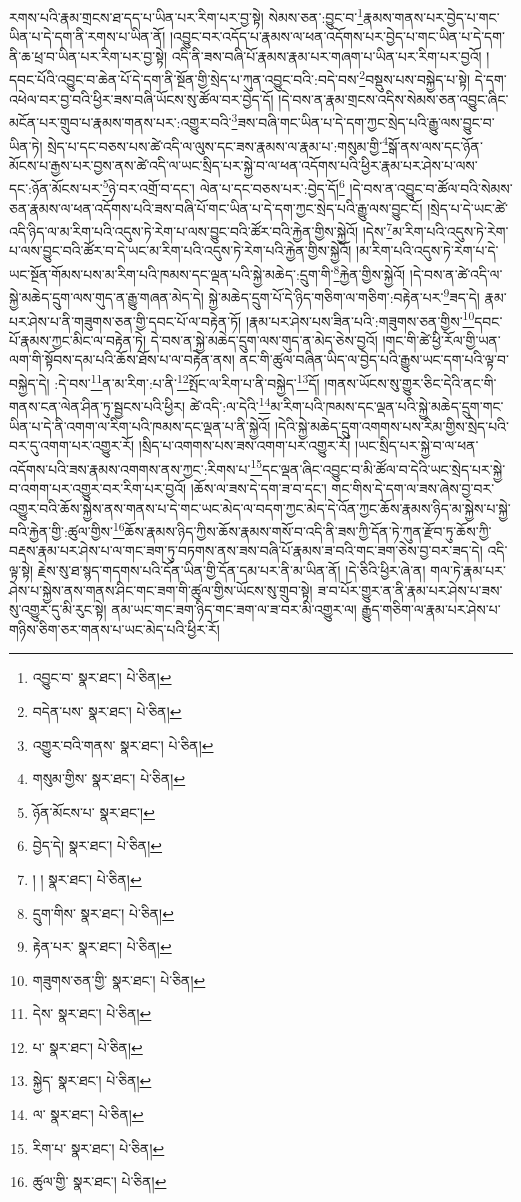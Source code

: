 རགས་པའི་རྣམ་གྲངས་ཐ་དད་པ་ཡིན་པར་རིག་པར་བྱ་སྟེ། སེམས་ཅན་:བྱུང་བ་\footnote{འབྱུང་བ་  སྣར་ཐང་།  པེ་ཅིན། }རྣམས་གནས་པར་བྱེད་པ་གང་ཡིན་པ་དེ་དག་ནི་རགས་པ་ཡིན་ནོ། །འབྱུང་བར་འདོད་པ་རྣམས་ལ་ཕན་འདོགས་པར་བྱེད་པ་གང་ཡིན་པ་དེ་དག་ནི་ཆ་ཕྲ་བ་ཡིན་པར་རིག་པར་བྱ་སྟེ། འདི་ནི་ཟས་བཞི་པོ་རྣམས་རྣམ་པར་གཞག་པ་ཡིན་པར་རིག་པར་བྱའོ། །དབང་པོའི་འབྱུང་བ་ཆེན་པོ་དེ་དག་ནི་སྔོན་གྱི་སྲེད་པ་ཀུན་འབྱུང་བའི་:བདེ་བས་\footnote{བདེན་པས་  སྣར་ཐང་།  པེ་ཅིན། }བསྡུས་པས་བསྐྱེད་པ་སྟེ། དེ་དག་འཕེལ་བར་བྱ་བའི་ཕྱིར་ཟས་བཞི་ཡོངས་སུ་ཚོལ་བར་བྱེད་དོ། །དེ་བས་ན་རྣམ་གྲངས་འདིས་སེམས་ཅན་འབྱུང་ཞིང་མངོན་པར་གྲུབ་པ་རྣམས་གནས་པར་:འགྱུར་བའི་\footnote{འགྱུར་བའི་གནས་  སྣར་ཐང་།  པེ་ཅིན། }ཟས་བཞི་གང་ཡིན་པ་དེ་དག་ཀྱང་སྲེད་པའི་རྒྱུ་ལས་བྱུང་བ་ཡིན་ཏེ། སྲེད་པ་དང་བཅས་པས་ཚེ་འདི་ལ་ལུས་དང་ཟས་རྣམས་ལ་རྣམ་པ་:གསུམ་གྱི་\footnote{གསུམ་གྱིས་  སྣར་ཐང་།  པེ་ཅིན། }སྒོ་ནས་ལས་དང་ཉོན་མོངས་པ་རྒྱས་པར་བྱས་ནས་ཚེ་འདི་ལ་ཡང་སྲིད་པར་སྐྱེ་བ་ལ་ཕན་འདོགས་པའི་ཕྱིར་རྣམ་པར་ཤེས་པ་ལས་དང་:ཉོན་མོངས་པར་\footnote{ཉོན་མོངས་པ་  སྣར་ཐང་། }ཉེ་བར་འགྲོ་བ་དང་། ལེན་པ་དང་བཅས་པར་:བྱེད་དོ།\footnote{བྱེད་དེ།  སྣར་ཐང་།  པེ་ཅིན། } །དེ་བས་ན་འབྱུང་བ་ཚོལ་བའི་སེམས་ཅན་རྣམས་ལ་ཕན་འདོགས་པའི་ཟས་བཞི་པོ་གང་ཡིན་པ་དེ་དག་ཀྱང་སྲེད་པའི་རྒྱུ་ལས་བྱུང་ངོ། །སྲེད་པ་དེ་ཡང་ཚེ་འདི་ཉིད་ལ་མ་རིག་པའི་འདུས་ཏེ་རེག་པ་ལས་བྱུང་བའི་ཚོར་བའི་རྐྱེན་གྱིས་སྐྱེའོ། །དེས་\footnote{། །  སྣར་ཐང་།  པེ་ཅིན། }མ་རིག་པའི་འདུས་ཏེ་རེག་པ་ལས་བྱུང་བའི་ཚོར་བ་དེ་ཡང་མ་རིག་པའི་འདུས་ཏེ་རེག་པའི་རྐྱེན་གྱིས་སྐྱེའོ། །མ་རིག་པའི་འདུས་ཏེ་རེག་པ་དེ་ཡང་སྔོན་གོམས་པས་མ་རིག་པའི་ཁམས་དང་ལྡན་པའི་སྐྱེ་མཆེད་:དྲུག་གི་\footnote{དྲུག་གིས་  སྣར་ཐང་།  པེ་ཅིན། }རྐྱེན་གྱིས་སྐྱེའོ། །དེ་བས་ན་ཚེ་འདི་ལ་སྐྱེ་མཆེད་དྲུག་ལས་གུད་ན་རྒྱུ་གཞན་མེད་དེ། སྐྱེ་མཆེད་དྲུག་པོ་དེ་ཉིད་གཅིག་ལ་གཅིག་:བརྟེན་པར་\footnote{རྟེན་པར་  སྣར་ཐང་།  པེ་ཅིན། }ཟད་དེ། རྣམ་པར་ཤེས་པ་ནི་གཟུགས་ཅན་གྱི་དབང་པོ་ལ་བརྟེན་ཏོ། །རྣམ་པར་ཤེས་པས་ཟིན་པའི་:གཟུགས་ཅན་གྱིས་\footnote{གཟུགས་ཅན་གྱི་  སྣར་ཐང་།  པེ་ཅིན། }དབང་པོ་རྣམས་ཀྱང་མིང་ལ་བརྟེན་ཏེ། དེ་བས་ན་སྐྱེ་མཆེད་དྲུག་ལས་གུད་ན་མེད་ཅེས་བྱའོ། །གང་གི་ཚེ་ཕྱི་རོལ་གྱི་ཡན་ལག་གི་སྟོབས་དམ་པའི་ཆོས་ཐོས་པ་ལ་བརྟེན་ནས། ནང་གི་ཚུལ་བཞིན་ཡིད་ལ་བྱེད་པའི་རྒྱུས་ཡང་དག་པའི་ལྟ་བ་བསྐྱེད་དེ། :དེ་བས་\footnote{དེས་  སྣར་ཐང་།  པེ་ཅིན། }ན་མ་རིག་:པ་ནི་\footnote{པ་  སྣར་ཐང་།  པེ་ཅིན། }སྤོང་ལ་རིག་པ་ནི་བསྐྱེད་\footnote{སྐྱེད་  སྣར་ཐང་།  པེ་ཅིན། }དོ། །གནས་ཡོངས་སུ་གྱུར་ཅིང་དེའི་ནང་གི་གནས་ངན་ལེན་ཤིན་ཏུ་སྦྱངས་པའི་ཕྱིར། ཚེ་འདི་:ལ་དེའི་\footnote{ལ་  སྣར་ཐང་།  པེ་ཅིན། }མ་རིག་པའི་ཁམས་དང་ལྡན་པའི་སྐྱེ་མཆེད་དྲུག་གང་ཡིན་པ་དེ་ནི་འགག་ལ་རིག་པའི་ཁམས་དང་ལྡན་པ་ནི་སྐྱེའོ། །དེའི་སྐྱེ་མཆེད་དྲུག་འགགས་པས་རིམ་གྱིས་སྲེད་པའི་བར་དུ་འགག་པར་འགྱུར་རོ། །སྲིད་པ་འགགས་པས་ཟས་འགག་པར་འགྱུར་རོ། །ཡང་སྲིད་པར་སྐྱེ་བ་ལ་ཕན་འདོགས་པའི་ཟས་རྣམས་འགགས་ནས་ཀྱང་:རིགས་པ་\footnote{རིག་པ་  སྣར་ཐང་།  པེ་ཅིན། }དང་ལྡན་ཞིང་འབྱུང་བ་མི་ཚོལ་བ་དེའི་ཡང་སྲེད་པར་སྐྱེ་བ་འགག་པར་འགྱུར་བར་རིག་པར་བྱའོ། །ཆོས་ལ་ཟས་དེ་དག་ཟ་བ་དང་། གང་གིས་དེ་དག་ལ་ཟས་ཞེས་བྱ་བར་འགྱུར་བའི་ཆོས་སྐྱེས་ནས་གནས་པ་དེ་གང་ཡང་མེད་ལ་བདག་ཀྱང་མེད་དེ་འོན་ཀྱང་ཆོས་རྣམས་ཉིད་མ་སྐྱེས་པ་སྐྱེ་བའི་རྐྱེན་གྱི་:ཚུལ་གྱིས་\footnote{ཚུལ་གྱི་  སྣར་ཐང་།  པེ་ཅིན། }ཆོས་རྣམས་ཉིད་ཀྱིས་ཆོས་རྣམས་གསོ་བ་འདི་ནི་ཟས་ཀྱི་དོན་ཏེ་ཀུན་རྫོབ་ཏུ་ཆོས་ཀྱི་བརྡས་རྣམ་པར་ཤེས་པ་ལ་གང་ཟག་ཏུ་བཏགས་ནས་ཟས་བཞི་པོ་རྣམས་ཟ་བའི་གང་ཟག་ཅེས་བྱ་བར་ཟད་དེ། འདི་ལྟ་སྟེ། རྗེས་སུ་ཐ་སྙད་གདགས་པའི་དོན་ཡིན་གྱི་དོན་དམ་པར་ནི་མ་ཡིན་ནོ། །དེ་ཅིའི་ཕྱིར་ཞེ་ན། གལ་ཏེ་རྣམ་པར་ཤེས་པ་སྐྱེས་ནས་གནས་ཤིང་གང་ཟག་གི་ཚུལ་གྱིས་ཡོངས་སུ་གྲུབ་སྟེ། ཟ་བ་པོར་གྱུར་ན་ནི་རྣམ་པར་ཤེས་པ་ཟས་སུ་འགྱུར་དུ་མི་རུང་སྟེ། ནམ་ཡང་གང་ཟག་ཉིད་གང་ཟག་ལ་ཟ་བར་མི་འགྱུར་ལ། རྒྱུད་གཅིག་ལ་རྣམ་པར་ཤེས་པ་གཉིས་ཅིག་ཅར་གནས་པ་ཡང་མེད་པའི་ཕྱིར་རོ། 